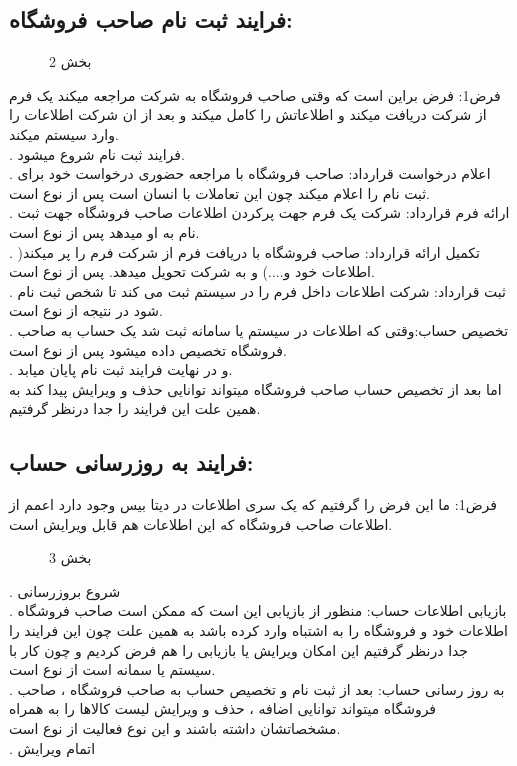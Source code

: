\documentclass[12pt,onecolumn,a4paper]{article}
\begin{document}
\subsection{    فرایند ثبت نام صاحب فروشگاه: }

\begin{figure}[!h]
\caption{ بخش 2 }\label{bizz}
\end{figure}

فرض1: فرض براین است که وقتی صاحب فروشگاه به شرکت مراجعه میکند یک فرم از شرکت دریافت میکند و اطلاعاتش را کامل میکند و بعد از ان شرکت اطلاعات را وارد سیستم میکند.\\

.	فرایند ثبت نام شروع میشود.\\
.	اعلام درخواست قرارداد: صاحب فروشگاه با مراجعه حضوری درخواست خود برای ثبت نام را اعلام میکند چون این تعاملات با انسان است پس از نوع است.\\
.	ارائه فرم قرارداد: شرکت یک فرم جهت پرکردن اطلاعات صاحب فروشگاه جهت ثبت نام به او میدهد پس از نوع  است.\\
.	تکمیل ارائه قرارداد: صاحب فروشگاه با دریافت فرم از شرکت فرم را پر میکند( اطلاعات خود و....) و به شرکت تحویل میدهد. پس از نوع  است.\\
.	ثبت قرارداد: شرکت اطلاعات داخل فرم را در سیستم ثبت می کند تا شخص ثبت نام شود در نتیجه از نوع  است.\\
.	تخصیص حساب:وقتی که اطلاعات در سیستم یا سامانه ثبت شد یک حساب به صاحب فروشگاه تخصیص داده میشود پس از نوع است.\\
.	و در نهایت فرایند ثبت نام پایان میابد.\\

اما بعد از تخصیص حساب صاحب فروشگاه میتواند توانایی حذف و ویرایش پیدا کند به همین علت این فرایند را جدا درنظر گرفتیم.\\

\subsection{فرایند به روزرسانی حساب:}
فرض1: ما این فرض را گرفتیم که یک سری اطلاعات در دیتا بیس وجود دارد اعمم از اطلاعات صاحب فروشگاه که این اطلاعات هم قابل ویرایش است.\\

\afterpage{\FloatBarrier}
\begin{figure}[!h]
\caption{ بخش 3 }\label{bizzz}
\end{figure}
.	شروع بروزرسانی\\
.	بازیابی اطلاعات حساب: منظور از بازیابی این است که ممکن است صاحب فروشگاه اطلاعات خود و فروشگاه را به اشتباه وارد کرده باشد به همین علت چون این فرایند را جدا درنظر گرفتیم این امکان ویرایش یا بازیابی را هم فرض کردیم و چون کار با سیستم یا سمانه است از نوع  است.\\
.	به روز رسانی حساب: بعد از ثبت نام و تخصیص حساب به صاحب فروشگاه ، صاحب فروشگاه میتواند توانایی اضافه ، حذف و ویرایش لیست کالاها را به همراه مشخصاتشان داشته باشند و این نوع فعالیت از نوع  است.\\
.	اتمام ویرایش\\
\end{document}
